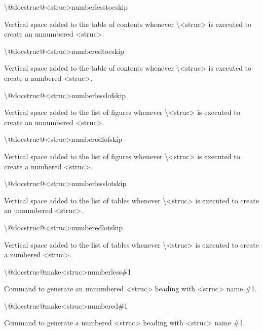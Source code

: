 \documentclass[twoside,openany]{thesis}
\begin{document}
\begin{listing}

\item   {\ttfamily\textbackslash @docstruc@<struc>numberlesstocskip}

        Vertical space added to the table of contents whenever {\ttfamily\textbackslash<struc>} is executed to create an unnumbered {\ttfamily<struc>}.

\item   {\ttfamily\textbackslash @docstruc@<struc>numberedtocskip}

        Vertical space added to the table of contents whenever {\ttfamily\textbackslash<struc>} is executed to create a numbered {\ttfamily<struc>}.

\item   {\ttfamily\textbackslash @docstruc@<struc>numberlesslofskip}

        Vertical space added to the list of figures whenever {\ttfamily\textbackslash<struc>} is executed to create an unnumbered {\ttfamily<struc>}.

\item   {\ttfamily\textbackslash @docstruc@<struc>numberedlofskip}

        Vertical space added to the list of figures whenever {\ttfamily\textbackslash<struc>} is executed to create a numbered {\ttfamily<struc>}.

\item   {\ttfamily\textbackslash @docstruc@<struc>numberlesslotskip}

        Vertical space added to the list of tables whenever {\ttfamily\textbackslash<struc>} is executed to create an unnumbered {\ttfamily<struc>}.

\item   {\ttfamily\textbackslash @docstruc@<struc>numberedlotskip}

        Vertical space added to the list of tables whenever {\ttfamily\textbackslash<struc>} is executed to create a numbered {\ttfamily<struc>}.

\item   {\ttfamily\textbackslash @docstruc@make<struc>numberless\#1}

        Command to generate an unnumbered {\ttfamily<struc>} heading with {\ttfamily<struc>} name {\ttfamily\#1}.

\item   {\ttfamily\textbackslash @docstruc@make<struc>numbered\#1}

        Command to generate a numbered {\ttfamily<struc>} heading with {\ttfamily<struc>} name {\ttfamily\#1}.

\end{listing}
\end{document}
